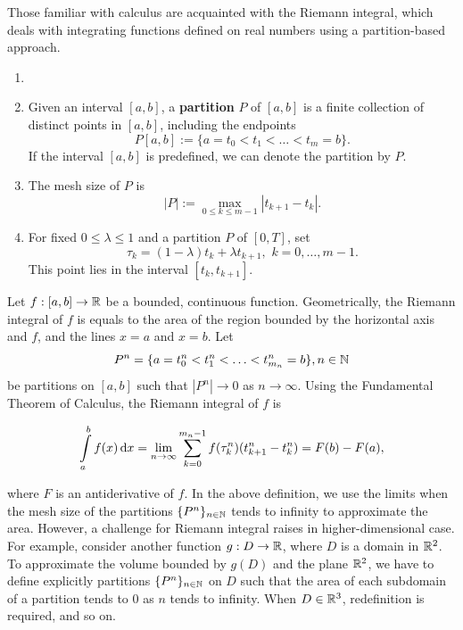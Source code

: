 Those familiar with calculus are acquainted with the Riemann integral, which deals with integrating functions defined on real numbers using a partition-based approach.

\begin{definition}
 \begin{enumerate}
  \item []
  \item Given an interval $[a,b]$, a \textbf{partition} $P$ of $[a,b]$ is a finite collection of distinct points in $[a, b]$, including the endpoints
        $$P[a,b]:=\{a=t_0<t_1<\ldots<t_{m}=b\}.$$
        If the interval $[a,b]$ is predefined, we can denote the partition by $P$.
  \item The mesh size of $P$ is
        $$|P|:=\max\limits_{0\le k\le m-1}|t_{k+1}-t_k|.$$
  \item For fixed $0\le\lambda\le 1$ and a partition $P$ of $[0,T]$, set
        $$\tau_k = (1-\lambda) t_k + \lambda t_{k+1},\,\, k=0,\ldots,m-1.$$
        This point lies in the interval $[t_k,t_{k+1}]$.
 \end{enumerate}
\end{definition}

Let $f: [a,b]\to\mathbb{R}$ be a bounded, continuous function. Geometrically, the Riemann integral of $f$ is equals to the area of the region bounded by the horizontal axis and $f$, and the lines $x=a$ and $x=b$. Let
$$P^n=\{a=t^n_0<t^n_1<\ldots<t^n_{m_n}=b\}, n\in\mathbb{N}$$ be partitions on $[a,b]$ such that $|P^n|\to 0$ as $n\to\infty$. Using the Fundamental Theorem of Calculus, the Riemann integral of $f$ is

\begin{equation}
 \label{equation:definition:riemann-integral}
 \int\limits_a^b f(x)\,\mathrm{d}  x = \lim\limits_{n\to\infty}\sum\limits_{k=0}^{m_n-1}f(\tau_k^n)(t_{k+1}^n-t_k^n) = F(b)-F(a),
\end{equation}

where $F$ is an antiderivative of $f$. In the above definition, we use the limits when the mesh size of the partitions $\{P^n\}_{n\in\mathbb{N}}$ tends to infinity to approximate the area. However, a challenge for Riemann integral raises in higher-dimensional case. For example, consider another function $g: D\to\mathbb{R}$, where $D$ is a domain in $\mathbb{R}^2$. To approximate the volume bounded by $g(D)$ and the plane $\mathbb{R}^2$, we have to define explicitly partitions $\{P^n\}_{n\in\mathbb{N}}$ on $D$ such that the area of each subdomain of a partition tends to $0$ as $n$ tends to infinity. When $D\in\mathbb{R}^3$, redefinition is required, and so on.

